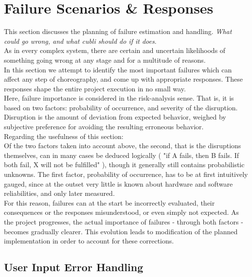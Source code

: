 \section{Failure Scenarios \& Responses}
This section discusses the planning of failure estimation and handling.
\textit{What could go wrong, and what cubli should do if it does}.\\

As in every complex system, there are certain and uncertain likelihoods of something going wrong at any stage and for a multitude of reasons.\\

In this section we attempt to identify the most important failures which can affect any step of choreography, and come up with appropriate responses. These responses shape the entire project execution in no small way.\\

Here, failure importance is considered in the risk-analysis sense. That is, it is based on two factors: probability of occurrence, and severity of the disruption. Disruption is the amount of deviation from expected behavior, weighed by subjective preference for avoiding the resulting erroneous behavior. \\

Regarding the usefulness of this section:\\

Of the two factors taken into account above, the second, that is the disruptions themselves, can in many cases be deduced logically ( "if A fails, then B fails. If both fail, X will not be fulfilled" ), though it generally still contains probabilistic unknowns. The first factor, probability of occurrence, has to be at first intuitively gauged, since at the outset very little is known about hardware and software reliabilities, and only later measured.\\

For this reason, failures can at the start be incorrectly evaluated, their consequences or the responses misunderstood, or even simply not expected. As the project progresses, the actual importance of failures - through both factors - becomes gradually clearer.  This evolution leads to modification of the planned implementation in order to account for these corrections.

\subsection{User Input Error Handling}

